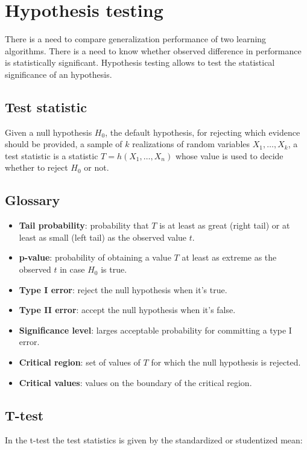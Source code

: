 \section{Hypothesis testing}
There is a need to compare generalization performance of two learning algorithms.
There is a need to know whether observed difference in performance is statistically significant.
Hypothesis testing allows to test the statistical significance of an hypothesis.

	\subsection{Test statistic}
	Given a null hypothesis $H_0$, the default hypothesis, for rejecting which evidence should be provided, a sample of $k$ realizations of random variables $X_1, \dots, X_k$, a test statistic is a statistic $T = h(X_1, \dots, X_n)$ whose value is used to decide whether to reject $H_0$ or not.

	\subsection{Glossary}

	\begin{multicols}{2}
		\begin{itemize}
			\item \textbf{Tail probability}: probability that $T$ is at least as great (right tail) or at least as small (left tail) as the observed value $t$.
			\item \textbf{p-value}: probability of obtaining a value $T$ at least as extreme as the observed $t$ in case $H_0$ is true.
			\item \textbf{Type I error}: reject the null hypothesis when it's true.
			\item \textbf{Type II error}: accept the null hypothesis when it's false.
			\item \textbf{Significance level}: larges acceptable probability for committing a type I error.
			\item \textbf{Critical region}: set of values of $T$ for which the null hypothesis is rejected.
			\item \textbf{Critical values}: values on the boundary of the critical region.
				\end{itemize}
	\end{multicols}

	\subsection{T-test}
	In the t-test the test statistics is given by the standardized or studentized mean:

